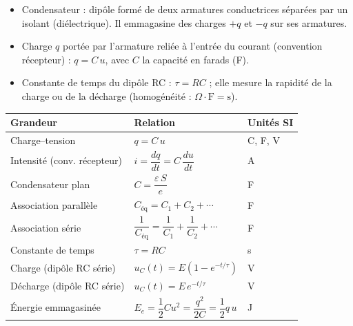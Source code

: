 \documentclass[11pt]{article}
\newcommand{\cle}[1]{{\popxbold\color{popdark}#1}}
\begin{document}
\begin{definition}
\begin{itemize}
  \item \cle{Condensateur} : dipôle formé de deux \cle{armatures} conductrices séparées par un \cle{isolant} (diélectrique). Il emmagasine des charges $+q$ et $-q$ sur ses armatures.
  \item \cle{Charge} $q$ portée par l'armature reliée à l'entrée du courant (convention récepteur) : $q = C\,u$, avec $C$ la \cle{capacité} en farads (F).
  \item \cle{Constante de temps} du dipôle RC : $\tau = RC$ ; elle mesure la rapidité de la charge ou de la décharge (homogénéité : $\Omega \cdot \text{F} = \text{s}$).
\end{itemize}
\end{definition}

\begin{propriete}
\begin{center}
\begin{tabularx}{\linewidth}{|l|X|l|}
\hline
\rowcolor{popblueL} \textbf{Grandeur} & \textbf{Relation} & \textbf{Unités SI} \\
\hline
Charge--tension & $q = C\,u$ & C, F, V \\
\hline
Intensité (conv. récepteur) & $i = \dfrac{dq}{dt} = C\,\dfrac{du}{dt}$ & A \\
\hline
Condensateur plan & $C = \dfrac{\varepsilon\, S}{e}$ & F \\
\hline
Association parallèle & $C_{\text{éq}} = C_1 + C_2 + \cdots$ & F \\
\hline
Association série & $\dfrac{1}{C_{\text{éq}}} = \dfrac{1}{C_1} + \dfrac{1}{C_2} + \cdots$ & F \\
\hline
Constante de temps & $\tau = RC$ & s \\
\hline
Charge (dipôle RC série) & $u_C(t) = E\left(1 - e^{-t/\tau}\right)$ & V \\
\hline
Décharge (dipôle RC série) & $u_C(t) = E\,e^{-t/\tau}$ & V \\
\hline
Énergie emmagasinée & $E_e = \dfrac{1}{2}C u^2 = \dfrac{q^2}{2C} = \dfrac{1}{2}q\,u$ & J \\
\hline
\end{tabularx}
\end{center}
\end{propriete}
\end{document}
